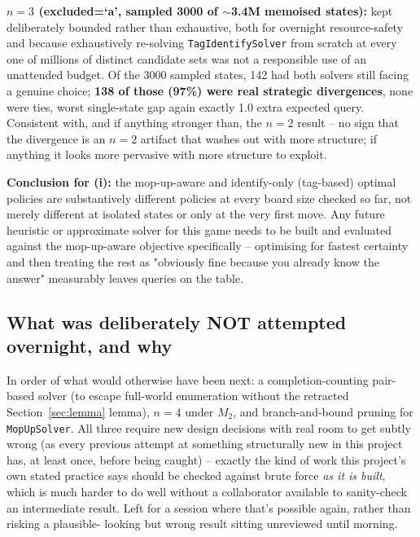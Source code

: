 \documentclass[11pt]{article}
\begin{document}
\textbf{$n=3$ (excluded=`a', sampled 3000 of $\sim$3.4M memoised
states):} kept deliberately bounded rather than exhaustive, both for
overnight resource-safety and because exhaustively re-solving
\texttt{TagIdentifySolver} from scratch at every one of millions of
distinct candidate sets was not a responsible use of an unattended
budget. Of the 3000 sampled states, 142 had both solvers still facing a
genuine choice; \textbf{138 of those (97\%) were real strategic
divergences}, none were ties, worst single-state gap again exactly 1.0
extra expected query. Consistent with, and if anything stronger than, the
$n=2$ result -- no sign that the divergence is an $n=2$ artifact that
washes out with more structure; if anything it looks more pervasive with
more structure to exploit.

\textbf{Conclusion for (i):} the mop-up-aware and identify-only
(tag-based) optimal policies are substantively different policies at
every board size checked so far, not merely different at isolated states
or only at the very first move. Any future heuristic or approximate
solver for this game needs to be built and evaluated against the
mop-up-aware objective specifically -- optimising for fastest certainty
and then treating the rest as "obviously fine because you already know
the answer" measurably leaves queries on the table.

\subsection{What was deliberately NOT attempted overnight, and why}

In order of what would otherwise have been next: a completion-counting
pair-based solver (to escape full-world enumeration without the
retracted Section~\ref{sec:lemma} lemma), $n=4$ under $M_2$, and
branch-and-bound pruning for \texttt{MopUpSolver}. All three require new
design decisions with real room to get subtly wrong (as every previous
attempt at something structurally new in this project has, at least
once, before being caught) -- exactly the kind of work this project's
own stated practice says should be checked against brute force
\emph{as it is built}, which is much harder to do well without a
collaborator available to sanity-check an intermediate result. Left for
a session where that's possible again, rather than risking a plausible-
looking but wrong result sitting unreviewed until morning.
\end{document}
